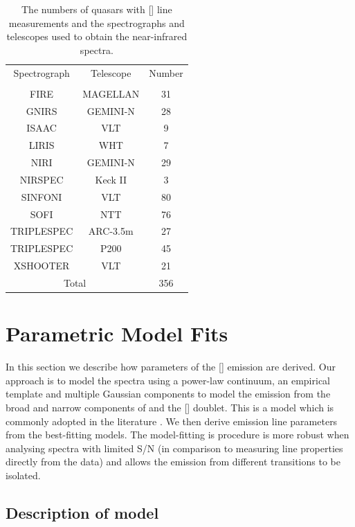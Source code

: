\begin{table}
  \centering
  \small 
  \caption{The numbers of quasars with [] line measurements and the spectrographs and telescopes used to obtain the near-infrared spectra.}
  \label{tab:specnums_ch4}
    \begin{tabular}{ccc} 
    \hline
    Spectrograph & Telescope & Number \\
                 &           & \\
    \hline
    FIRE         & MAGELLAN  & 31 \\
    GNIRS        & GEMINI-N  & 28 \\
    ISAAC        & VLT       & 9 \\
    LIRIS        & WHT       & 7 \\
    NIRI         & GEMINI-N  & 29 \\
    NIRSPEC      & Keck II   & 3 \\
    SINFONI      & VLT       & 80 \\
    SOFI         & NTT       & 76 \\
    TRIPLESPEC   & ARC-3.5m  & 27 \\
    TRIPLESPEC   & P200      & 45 \\
    XSHOOTER     & VLT       & 21 \\
    \hline
    \multicolumn{2}{c}{Total} & 356 \\
    \hline
    \end{tabular}
\end{table} 

\section{Parametric Model Fits}

In this section we describe how parameters of the [] emission are derived. 
Our approach is to model the spectra using a power-law continuum, an empirical  template and multiple Gaussian components to model the emission from the broad and narrow components of \hb and the [] doublet.
This is a model which is commonly adopted in the literature \citep[e.g.][]{shen11}. 
We then derive emission line parameters from the best-fitting models. 
The model-fitting is procedure is more robust when analysing spectra with limited \ac{S/N} (in comparison to measuring line properties directly from the data) and allows the emission from different transitions to be isolated. 

\subsection{Description of model}

